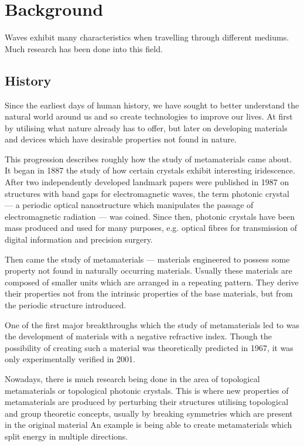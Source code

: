 \chapter{Background}
Waves exhibit many characteristics when travelling through different mediums.
Much research has been done into this field.

\section{History}
Since the earliest days of human history, we have sought to better understand
the natural world around us and so create technologies to improve our lives. At
first by utilising what nature already has to offer, but later on developing
materials and devices which have desirable properties not found in nature.

This progression describes roughly how the study of metamaterials came about.
It began in 1887 the study of how certain crystals exhibit interesting
iridescence.\cite{pcearliest} After two independently developed landmark
papers were published in 1987 on structures with band gaps for electromagnetic
waves,\cite{pceli,pcjohn} the term photonic crystal --- a periodic optical
nanostructure which manipulates the passage of electromagnetic radiation ---
was coined.\cite{pcfocus} Since then, photonic crystals have been mass produced
and used for many purposes, e.g. optical fibres for transmission of digital
information \cite{pcopfib} and precision surgery.\cite{pcsurgery,pcneuro}

Then came the study of metamaterials --- materials engineered to possess some
property not found in naturally occurring materials.\cite{briefintro} Usually
these materials are composed of smaller units which are arranged in a repeating
pattern. They derive their properties not from the intrinsic properties of the
base materials, but from the periodic structure introduced.

One of the first major breakthroughs which the study of metamaterials led to
was the development of materials with a negative refractive index. Though the
possibility of creating such a material was theoretically predicted in
1967,\cite{negrefrac} it was only experimentally verified in
2001.\cite{negrefracex}

Nowadays, there is much research being done in the area of topological
metamaterials or topological photonic
crystals.\cite{topoedge,toposplit,topomet} This is where new properties of
metamaterials are produced by perturbing their structures utilising topological
and group theoretic concepts, usually by breaking symmetries which are present
in the original material An example is being able to create metamaterials which
split energy in multiple directions.\cite{toposplit} 

